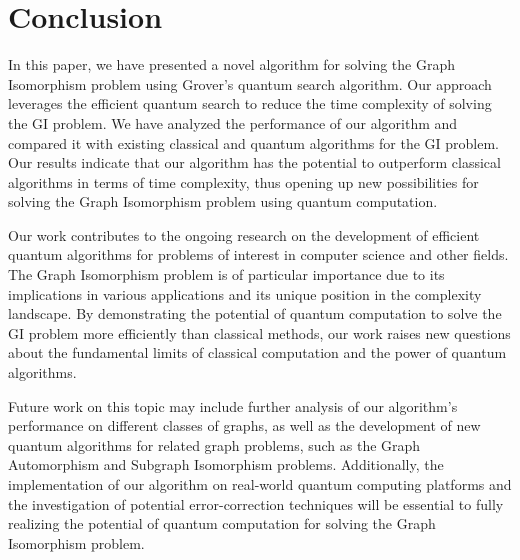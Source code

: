 \section{Conclusion}

In this paper, we have presented a novel algorithm for solving the Graph Isomorphism problem using Grover's quantum search algorithm. Our approach leverages the efficient quantum search to reduce the time complexity of solving the GI problem. We have analyzed the performance of our algorithm and compared it with existing classical and quantum algorithms for the GI problem. Our results indicate that our algorithm has the potential to outperform classical algorithms in terms of time complexity, thus opening up new possibilities for solving the Graph Isomorphism problem using quantum computation.

Our work contributes to the ongoing research on the development of efficient quantum algorithms for problems of interest in computer science and other fields. The Graph Isomorphism problem is of particular importance due to its implications in various applications and its unique position in the complexity landscape. By demonstrating the potential of quantum computation to solve the GI problem more efficiently than classical methods, our work raises new questions about the fundamental limits of classical computation and the power of quantum algorithms.

Future work on this topic may include further analysis of our algorithm's performance on different classes of graphs, as well as the development of new quantum algorithms for related graph problems, such as the Graph Automorphism and Subgraph Isomorphism problems. Additionally, the implementation of our algorithm on real-world quantum computing platforms and the investigation of potential error-correction techniques will be essential to fully realizing the potential of quantum computation for solving the Graph Isomorphism problem.

